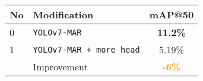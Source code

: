   \begin{tabular}{ l l c }
    \toprule[1.5pt]
    No & Modification                                &mAP@50 \\
    \midrule
    0  & \texttt{YOLOv7-MAR}                        & \textbf{11.2\%}\\
    1  & \texttt{YOLOv7-MAR + more head}            & 5.19\%\\
    \midrule
       & Improvement                                & \textbf{\textcolor{orange}{-6\%}}\\
    \bottomrule[1.5pt]
  \end{tabular}